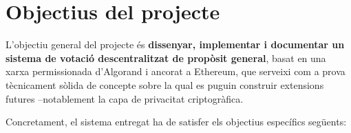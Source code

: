 

\section{Objectius del projecte}
\label{sec:objectiu}

L'objectiu general del projecte és \textbf{dissenyar, implementar i documentar un sistema de votació descentralitzat de
propòsit general}, basat en una xarxa permissionada d'Algorand i ancorat a Ethereum, que serveixi com a prova
tècnicament sòlida de concepte sobre la qual es puguin construir extensions futures --notablement la capa de privacitat
criptogràfica.

Concretament, el sistema entregat ha de satisfer els objectius específics següents:

